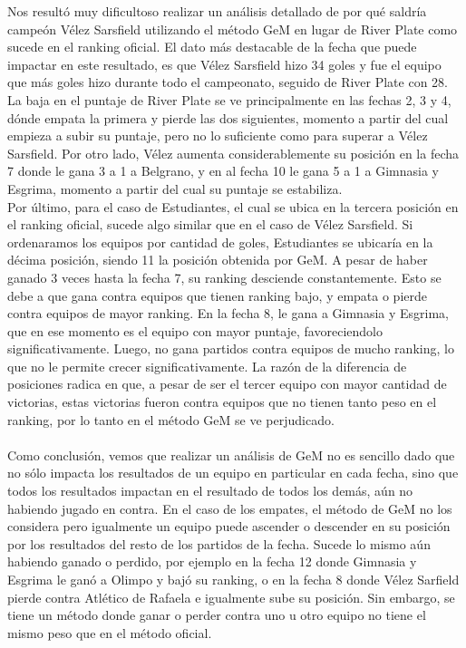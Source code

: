 Nos resultó muy dificultoso realizar un análisis detallado de por qué saldría campeón Vélez Sarsfield utilizando el método GeM en lugar de River Plate como sucede en el ranking oficial. El dato más destacable de la fecha que puede impactar en este resultado, es que Vélez Sarsfield hizo 34 goles y fue el equipo que más goles hizo durante todo el campeonato, seguido de River Plate con 28. La baja en el puntaje de River Plate se ve principalmente en las fechas 2, 3 y 4, dónde empata la primera y pierde las dos siguientes, momento a partir del cual empieza a subir su puntaje, pero no lo suficiente como para superar a Vélez Sarsfield. Por otro lado, Vélez aumenta considerablemente su posición en la fecha 7 donde le gana 3 a 1 a Belgrano, y en al fecha 10 le gana 5 a 1 a Gimnasia y Esgrima, momento a partir del cual su puntaje se estabiliza.\\

Por último, para el caso de Estudiantes, el cual se ubica en la tercera posición en el ranking oficial, sucede algo similar que en el caso de Vélez Sarsfield. Si ordenaramos los equipos por cantidad de goles, Estudiantes se ubicaría en la décima posición, siendo 11 la posición obtenida por GeM. A pesar de haber ganado 3 veces hasta la fecha 7, su ranking desciende constantemente. Esto se debe a que gana contra equipos que tienen ranking bajo, y empata o pierde contra equipos de mayor ranking. En la fecha 8, le gana a Gimnasia y Esgrima, que en ese momento es el equipo con mayor puntaje, favoreciendolo significativamente. Luego, no gana partidos contra equipos de mucho ranking, lo que no le permite crecer significativamente. La razón de la diferencia de posiciones radica en que, a pesar de ser el tercer equipo con mayor cantidad de victorias, estas victorias fueron contra equipos que no tienen tanto peso en el ranking, por lo tanto en el método GeM se ve perjudicado. \\
\\
Como conclusión, vemos que realizar un análisis de GeM no es sencillo dado que no sólo impacta los resultados de un equipo en particular en cada fecha, sino que todos los resultados impactan en el resultado de todos los demás, aún no habiendo jugado en contra. En el caso de los empates, el método de GeM no los considera pero igualmente un equipo puede ascender o descender en su posición por los resultados del resto de los partidos de la fecha. Sucede lo mismo aún habiendo ganado o perdido, por ejemplo en la fecha 12 donde Gimnasia y Esgrima le ganó a Olimpo y bajó su ranking, o en la fecha 8 donde Vélez Sarfield pierde contra Atlético de Rafaela e igualmente sube su posición. Sin embargo, se tiene un método donde ganar o perder contra uno u otro equipo no tiene el mismo peso que en el método oficial.


